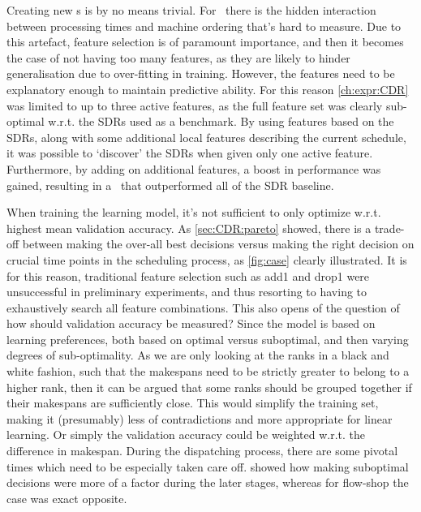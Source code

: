 \documentclass[smallextended]{svjour3}
\begin{document}
Creating new \dr s is by no means trivial. For \jsp\ there is 
the hidden interaction between processing times and machine ordering that's 
hard to measure.
Due to this artefact, feature selection is of paramount importance, and then it 
becomes the case of not having too many features, as they are likely to hinder 
generalisation due to over-fitting in training. However, the features need to 
be explanatory enough to maintain predictive ability. 
For this reason \cref{ch:expr:CDR} was limited to up to three active features, 
as the full feature set was clearly sub-optimal w.r.t. the SDRs used as a 
benchmark. 
By using features based on the SDRs, along with some additional local features 
describing the current schedule, it was possible to `discover' the SDRs when 
given only one active feature. %
Furthermore, by adding on additional features, a boost in performance was 
gained, resulting in a \cdr\ that outperformed all of the 
SDR baseline. 

When training the learning model, it's not sufficient to only optimize w.r.t. 
highest mean validation accuracy. As \cref{sec:CDR:pareto} showed, there is a 
trade-off between making the over-all best decisions versus making the right 
decision on crucial time points in the scheduling process, as \cref{fig:case} 
clearly illustrated. It is for this reason, traditional feature selection such 
as add1 and drop1 were unsuccessful in preliminary experiments, and thus 
resorting to having to exhaustively search all feature combinations.
This also opens of the question of how should validation accuracy be measured? 
Since the model is based on learning preferences, both based on optimal versus 
suboptimal, and then varying degrees of sub-optimality. As we are only looking 
at the ranks in a black and white fashion, such that the makespans need to be 
strictly greater to belong to a higher rank, then it can be argued that some 
ranks should be grouped together if their makespans are sufficiently close. 
This would simplify the training set, making it (presumably) less of 
contradictions and more appropriate for linear learning. Or simply the 
validation accuracy could be weighted w.r.t. the  difference in 
makespan.
During the dispatching process, there are some pivotal times which need to be 
especially taken care off.  showed how making suboptimal 
decisions were more of a factor during the later stages, whereas for flow-shop 
the case was exact opposite. 
\end{document}
